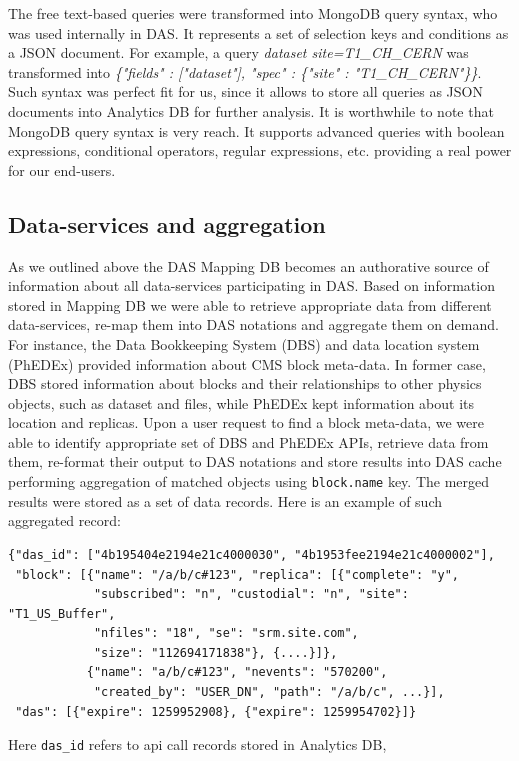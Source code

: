 \documentclass[1p,times]{elsarticle}
\begin{document}
The free text-based queries were transformed into MongoDB query syntax, 
who was used internally in DAS. It represents a set of selection 
keys and conditions as a JSON document. For example, a query
{\it dataset site=T1\_CH\_CERN}
was transformed into 
{\it \{"fields" : ["dataset"], "spec" : \{"site" : "T1\_CH\_CERN"\}\}}.
Such syntax was perfect fit for us, since it allows to store all queries
as JSON documents into Analytics DB for further analysis. It is worthwhile to note that
MongoDB query syntax is very reach. It supports advanced queries with 
boolean expressions, conditional operators, regular expressions, etc. providing
a real power for our end-users.

\subsection{Data-services and aggregation}
As we outlined above the DAS Mapping DB becomes an authorative
source of information about all data-services participating in DAS.
Based on information stored in Mapping DB we were able to 
retrieve appropriate data from different data-services, re-map them into 
DAS notations and aggregate them on demand. For instance, the Data 
Bookkeeping System (DBS) and data location system (PhEDEx)
provided information about CMS block meta-data. In former case, DBS 
stored information about blocks and their relationships to other 
physics objects, such as dataset and files, while PhEDEx kept
information about its location and replicas. Upon a user request to 
find a block meta-data, we were able to identify appropriate set of DBS and PhEDEx APIs, 
retrieve data from them, re-format their output to DAS notations 
and store results into DAS cache performing aggregation of matched 
objects using \verb+block.name+ key. The merged results were stored 
as a set of data records. Here is an example of such aggregated record:
\begin{verbatim}
{"das_id": ["4b195404e2194e21c4000030", "4b1953fee2194e21c4000002"], 
 "block": [{"name": "/a/b/c#123", "replica": [{"complete": "y", 
            "subscribed": "n", "custodial": "n", "site": "T1_US_Buffer", 
            "nfiles": "18", "se": "srm.site.com", 
            "size": "112694171838"}, {....}]},
           {"name": "a/b/c#123", "nevents": "570200", 
            "created_by": "USER_DN", "path": "/a/b/c", ...}],
 "das": [{"expire": 1259952908}, {"expire": 1259954702}]}
\end{verbatim}
Here \verb+das_id+ refers to api call records stored in Analytics DB,
\end{document}
